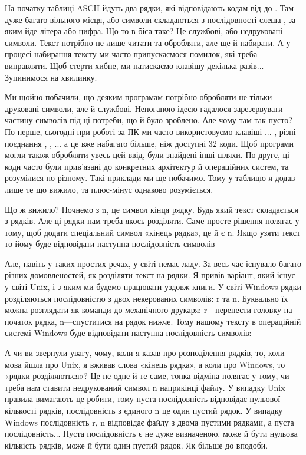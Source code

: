 На початку таблиці ASCII йдуть два рядки, які відповідають кодам від  до .
Там дуже багато вільного місця, або символи складаються з послідовності слеша \chesc{}, за яким йде літера або цифра.
Що то в біса таке?
Це службові, або недруковані символи.
Текст потрібно не лише читати та обробляти, але ще й набирати.
А у процесі набирання тексту ми часто припускаємося помилок, які треба виправляти.
Щоб стерти хибне,  ми натискаємо клавішу \keys{\backspace} декілька разів...
Зупинимося на хвилинку.

Ми щойно побачили, що деяким програмам потрібно обробляти не тільки друковані символи, але й службові.
Непоганою ідеєю гадалося зарезервувати частину символів під ці потреби, що й було зроблено.
Але чому там так пусто?
По-перше, сьогодні при роботі за ПК ми часто використовуємо клавіші  ... , різні поєднання , , ... а це вже набагато більше, ніж доступні $32$ коди.
Щоб програми могли також обробляти увесь цей ввід, були знайдені інші шляхи.
По-друге, ці коди часто були прив'язані до конкретних архітектур й операційних систем, та розумілися по різному.
Такі приклади ми ще побачимо.
Тому у таблицю я додав лише те що вижило, та плюс-мінус однаково розуміється.

Що ж вижило?
Почнемо з \chesc n, це символ кінця рядку.
Будь який текст складається з рядків.
Але ці рядки нам треба якось розділяти.
Саме просте рішення полягає у тому, щоб додати спеціальний символ «кінець рядка», це й є \chesc n.
Якщо узяти текст
\noindent то йому буде відповідати наступна послідовність символів

Але, навіть у таких простих речах, у світі немає ладу.
За весь час існувало багато різних домовленостей, як розділяти текст на рядки.
Я привів варіант, який існує у світі Unix, і з яким ми будемо працювати уздовж книги.
У світі Windows рядки розділяються послідовністю з двох некерованих символів: \chesc r та \chesc n.
Буквально їх можна розглядати як команди до механічного друкаря: \chesc r---перенести головку на початок рядка, \chesc n---спуститися на рядок нижче.
Тому нашому тексту в операційній системі Windows буде відповідати наступна послідовність символів:

А чи ви звернули увагу, чому, коли я казав про розподілення рядків, то, коли мова йшла про Unix, я вживав слова «кінець рядка», а коли про Windows, то «рядки розділяються»?
Це не одне й те саме, тонка відміна полягає у тому, чи треба нам ставити недрукований символ \chesc n наприкінці файлу.
У випадку Unix правила вимагають це робити, тому пуста послідовність відповідає нульової кількості рядків, послідовність з єдиного \chesc n це один пустий рядок.
У випадку Windows послідовність \chesc r, \chesc n відповідає файлу з двома пустими рядками, а пуста послідовність...
Пуста послідовність є не дуже визначеною, може й бути нульова кількість рядків, може й бути один пустий рядок.
Як більше до вподоби.

